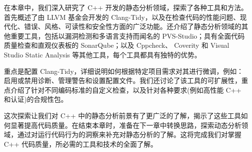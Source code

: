 
在本章中，我们深入研究了 C++ 开发的静态分析领域，探索了各种工具和方法。首先概述了由 LLVM 基金会开发的 Clang-Tidy，以及在检查代码的性能问题、现代化、错误、风格、可读性和安全性方面的广泛功能。还介绍了静态分析领域的其他重要工具，包括以漏洞检测和多语言支持而闻名的 PVS-Studio；具有全面代码质量检查和直观仪表板的 SonarQube；以及 Cppcheck、 Coverity 和 Visual Studio Static Analysis 等其他工具，每个工具都具有独特的优势。

重点是配置 Clang-Tidy，详细说明如何根据特定项目需求对其进行微调，例如：启用或禁用诊断、管理警告和设置配置文件。我们还讨论了该工具的可扩展性，重点介绍了针对不同编码标准的自定义检查，以及针对各种要求(例如高性能 C++ 和认证)的合规性包。

这次探索让我们对 C++ 中的静态分析前景有了更广泛的了解，揭示了这些工具如何显著提高代码质量。在结束本章时，准备在下一章中转换思路，探索动态分析领域，通过对运行代码行为的洞察来补充对静态分析的了解。这将完成我们对掌握 C++ 代码质量，所必需的工具和技术的全面了解。
